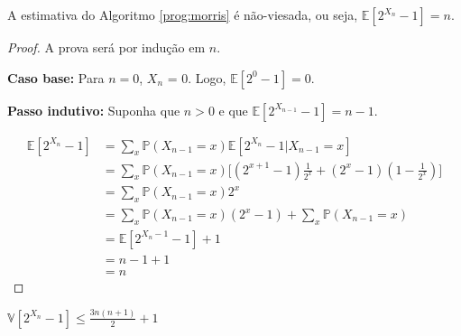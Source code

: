 \begin{lemma} \label{morris:expected_value}
A estimativa do Algoritmo \ref{prog:morris} é não-viesada, ou seja, $\mathbb{E}[2^{X_n} - 1] = n$.
\end{lemma}

\begin{proof}
A prova será por indução em $n$. 

\textbf{Caso base:} Para $n = 0$, $X_n$ = 0. Logo, $\mathbb{E}[2^0 - 1] = 0$.

\textbf{Passo indutivo:} Suponha que $n > 0$ e que $\mathbb{E}[2^{X_{n-1}} - 1] = n-1$.

\begin{align*}
  \mathbb{E}[2^{X_n} - 1] 
    &= \sum_{x} \mathbb{P} (X_{n-1} = x) \mathbb{E}[2^{X_n} - 1 | X_{n-1} = x] \\
    &= \sum_{x} \mathbb{P} (X_{n-1} = x) \Big[ (2^{x+1} - 1) \frac{1}{2^x} +  (2^x - 1) (1 - \frac{1}{2^x}) \Big] \\
    &= \sum_{x} \mathbb{P} (X_{n-1} = x) 2^x \\
    &= \sum_{x} \mathbb{P} (X_{n-1} = x) (2^x - 1) + \sum_{x} \mathbb{P} (X_{n-1} = x) \\
    &= \mathbb{E}[2^{X_n-1} - 1] + 1 \\
    &= n - 1 + 1 \\
    &= n
\end{align*}

\end{proof}

\begin{lemma} \label{morris:variance}
$\mathbb{V}[2^{X_n} - 1] \leq \frac{3n(n+1)}{2} + 1$
\end{lemma}

